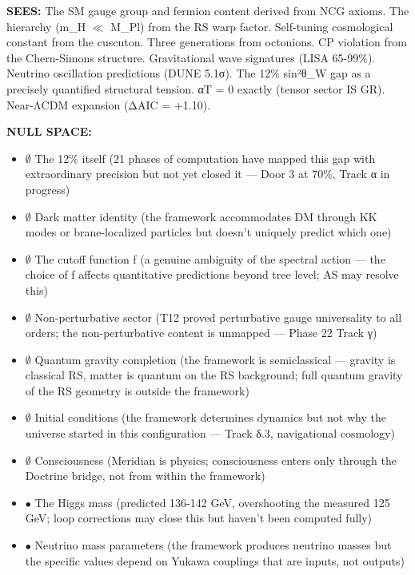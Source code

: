 \textbf{SEES:} The SM gauge group and fermion content derived from NCG axioms. The hierarchy (m\_H $\ll$ M\_Pl) from the RS warp factor. Self-tuning cosmological constant from the cuscuton. Three generations from octonions. CP violation from the Chern-Simons structure. Gravitational wave signatures (LISA 65-99\%). Neutrino oscillation predictions (DUNE 5.1σ). The 12\% sin²θ\_W gap as a precisely quantified structural tension. αT = 0 exactly (tensor sector IS GR). Near-ΛCDM expansion (ΔAIC = +1.10).


\textbf{NULL SPACE:}

\begin{itemize}[nosep,leftmargin=*]
  \item $\emptyset$ The 12\% itself (21 phases of computation have mapped this gap with extraordinary precision but not yet closed it — Door 3 at 70\%, Track α in progress)
  \item $\emptyset$ Dark matter identity (the framework accommodates DM through KK modes or brane-localized particles but doesn't uniquely predict which one)
  \item $\emptyset$ The cutoff function f (a genuine ambiguity of the spectral action — the choice of f affects quantitative predictions beyond tree level; AS may resolve this)
  \item $\emptyset$ Non-perturbative sector (T12 proved perturbative gauge universality to all orders; the non-perturbative content is unmapped — Phase 22 Track γ)
  \item $\emptyset$ Quantum gravity completion (the framework is semiclassical — gravity is classical RS, matter is quantum on the RS background; full quantum gravity of the RS geometry is outside the framework)
  \item $\emptyset$ Initial conditions (the framework determines dynamics but not why the universe started in this configuration — Track δ.3, navigational cosmology)
  \item $\emptyset$ Consciousness (Meridian is physics; consciousness enters only through the Doctrine bridge, not from within the framework)
  \item $\bullet$ The Higgs mass (predicted 136-142 GeV, overshooting the measured 125 GeV; loop corrections may close this but haven't been computed fully)
  \item $\bullet$ Neutrino mass parameters (the framework produces neutrino masses but the specific values depend on Yukawa couplings that are inputs, not outputs)
\end{itemize}


